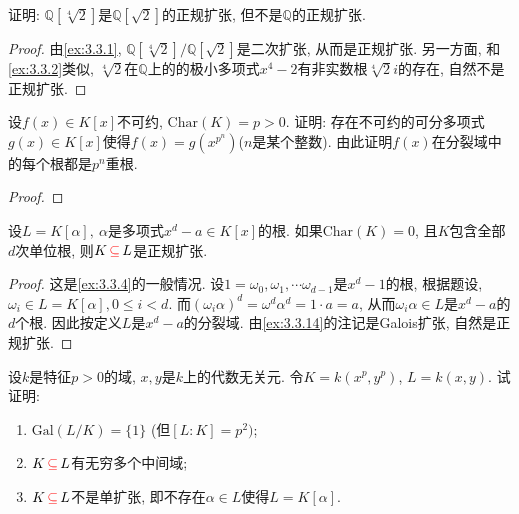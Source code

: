 \begin{problem}
    证明: $\mathbb{Q}[\sqrt[4]{2}]$是$\mathbb{Q}[\sqrt{2}]$的正规扩张, 但不是$\mathbb{Q}$的正规扩张.
\end{problem}

\begin{proof}
    由\ref{ex:3.3.1}, $\mathbb{Q}[\sqrt[4]{2}]/\mathbb{Q}[\sqrt{2}]$是二次扩张, 从而是正规扩张. 另一方面, 和\ref{ex:3.3.2}类似, $\sqrt[4]{2}$在$\mathbb{Q}$上的的极小多项式$x^4 - 2$有非实数根$\sqrt[4]{2}i$的存在, 自然不是正规扩张.
\end{proof}

\begin{problem}
    设$f(x) \in K[x]$不可约, $\mathrm{Char}(K) = p > 0$. 证明: 存在不可约的可分多项式$g(x) \in K[x]$使得$f(x) = g(x^{p^n})$($n$是某个整数). 由此证明$f(x)$在分裂域中的每个根都是$p^n$重根.
\end{problem}

\begin{proof}
    
\end{proof}

\begin{problem}
    设$L = K[\alpha],~\alpha$是多项式$x^d - a \in K[x]$的根. 如果$\mathrm{Char}(K) = 0$, 且$K$包含全部$d$次单位根, 则$K \,\textcolor{red}{\subseteq}\, L$是正规扩张.
\end{problem}

\begin{proof}
    这是\ref{ex:3.3.4}的一般情况. 设$1 = \omega_0, \omega_1, \cdots \omega_{d - 1}$是$x^d - 1$的根, 根据题设, $\omega_i \in L = K[\alpha], 0 \leqslant i < d$. 而$(\omega_i\alpha)^d = \omega^d\alpha^d = 1 \cdot a = a$, 从而$\omega_i\alpha \in L$是$x^d - a$的$d$个根. 因此按定义$L$是$x^d - a$的分裂域. 由\ref{ex:3.3.14}的注记是Galois扩张, 自然是正规扩张.
\end{proof}

\begin{problem}[*]\label{ex:3.3.14}
    设$k$是特征$p > 0$的域, $x, y$是$k$上的代数无关元. 令$K = k(x^p, y^p)$, $L = k(x, y)$. 试证明: 
    \begin{enumerate}[(1)]
        \item $\mathrm{Gal}(L/K) = \{1\}$ (但$[L:K] = p^2)$;
        \item $K \,\textcolor{red}{\subseteq}\, L$有无穷多个中间域;
        \item $K \,\textcolor{red}{\subseteq}\, L$不是单扩张, 即不存在$\alpha \in L$使得$L = K[\alpha]$.
    \end{enumerate}
\end{problem}

